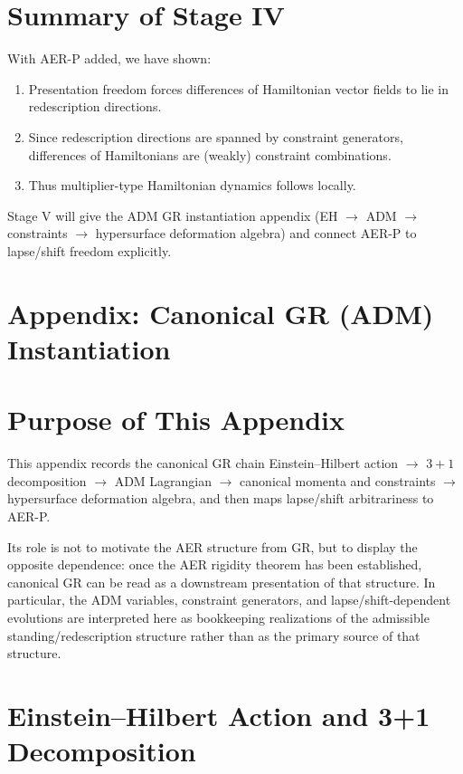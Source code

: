 \documentclass[11pt]{article}
\theoremstyle{remark}
\theoremstyle{plain}
\begin{document}
\section{Summary of Stage IV}

With AER-P added, we have shown:
\begin{enumerate}
\item Presentation freedom forces differences of Hamiltonian vector fields to lie in redescription directions.
\item Since redescription directions are spanned by constraint generators, differences of Hamiltonians are (weakly) constraint combinations.
\item Thus multiplier-type Hamiltonian dynamics follows locally.
\end{enumerate}

Stage V will give the ADM GR instantiation appendix (EH $\to$ ADM $\to$ constraints $\to$ hypersurface deformation algebra) and connect AER-P to lapse/shift freedom explicitly.



\appendix
\section*{Appendix: Canonical GR (ADM) Instantiation}




\section{Purpose of This Appendix}

This appendix records the canonical GR chain
Einstein--Hilbert action $\to$ $3+1$ decomposition $\to$ ADM Lagrangian
$\to$ canonical momenta and constraints $\to$ hypersurface deformation algebra,
and then maps lapse/shift arbitrariness to AER-P.

Its role is not to motivate the AER structure from GR, but to display the opposite dependence:
once the AER rigidity theorem has been established, canonical GR can be read as a downstream presentation of that structure. In particular, the ADM variables, constraint generators, and lapse/shift-dependent evolutions are interpreted here as bookkeeping realizations of the admissible standing/redescription structure rather than as the primary source of that structure.

\section{Einstein--Hilbert Action and 3+1 Decomposition}
\end{document}
